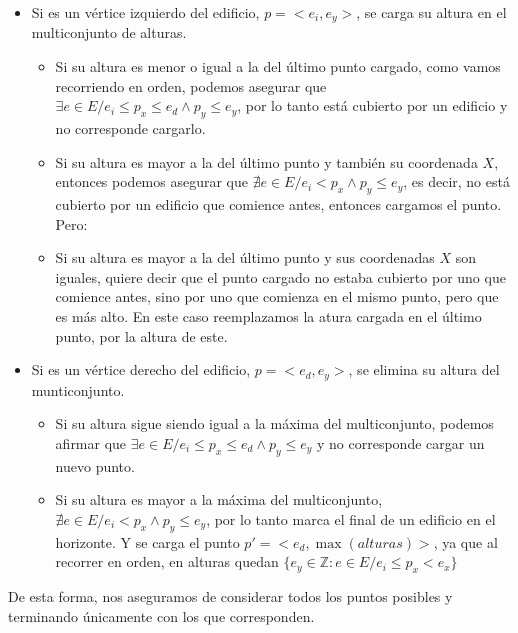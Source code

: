 \begin{itemize}
  \item Si es un vértice izquierdo del edificio, $p = <e_i, e_y>$, se carga su
  altura en el multiconjunto de alturas.
  \begin{itemize}
    \item Si su altura es menor o igual a la del último punto cargado, como
    vamos recorriendo en orden, podemos asegurar que $\exists e \in E / e_i \leq p_x \leq e_d \land p_y \leq e_y$,
    por lo tanto está cubierto por un edificio y no corresponde cargarlo.

    \item Si su altura es mayor a la del último punto y también su coordenada $X$,
    entonces podemos asegurar que $\nexists e \in E / e_i < p_x \land p_y \leq e_y$,
    es decir, no está cubierto por un edificio que comience antes, entonces cargamos
    el punto. Pero:

    \item Si su altura es mayor a la del último punto y sus coordenadas $X$ son
    iguales, quiere decir que el punto cargado no estaba cubierto por uno que comience
    antes, sino por uno que comienza en el mismo punto, pero que es más alto.
    En este caso reemplazamos la atura cargada en el último punto, por la altura
    de este.
  \end{itemize}

  \item Si es un vértice derecho del edificio, $p = <e_d, e_y>$, se elimina su
  altura del munticonjunto.
  \begin{itemize}
    \item Si su altura sigue siendo igual a la máxima del multiconjunto, podemos
    afirmar que $\exists e \in E / e_i \leq p_x \leq e_d \land p_y \leq e_y$ y
    no corresponde cargar un nuevo punto.

    \item Si su altura es mayor a la máxima del multiconjunto,
    $\nexists e \in E / e_i < p_x \land p_y \leq e_y$, por lo tanto marca el
    final de un edificio en el horizonte. Y se carga el punto $p' = <e_d, \max(alturas)>$,
    ya que al recorrer en orden, en alturas quedan $\{e_y \in \mathbb{Z} : e \in E / e_i \leq p_x < e_x\}$
  \end{itemize}
\end{itemize}

De esta forma, nos aseguramos de considerar todos los puntos posibles y terminando
únicamente con los que corresponden.


